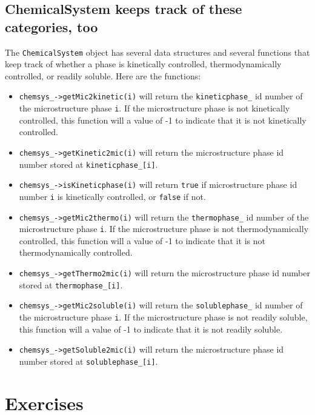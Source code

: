 \documentclass{article}
\begin{document}
\subsection{ChemicalSystem keeps track of these categories, too}
The \verb!ChemicalSystem! object has several data structures and several functions
that keep track of whether a phase is kinetically controlled, thermodynamically
controlled, or readily soluble.  Here are the functions:
\begin{itemize}
    \item  \verb!chemsys_->getMic2kinetic(i)! will return the \verb!kineticphase_! id
        number of the microstructure phase \verb!i!.  If the microstructure phase is
        not kinetically controlled, this function will a value of -1 to indicate
        that it is not kinetically controlled.
    \item  \verb!chemsys_->getKinetic2mic(i)! will return the microstructure phase
        id number stored at \verb!kineticphase_[i]!.
    \item  \verb!chemsys_->isKineticphase(i)! will return \verb!true! if microstructure
        phase id number \verb!i! is kinetically controlled, or \verb!false! if not.
    \item  \verb!chemsys_->getMic2thermo(i)! will return the \verb!thermophase_! id
        number of the microstructure phase \verb!i!.  If the microstructure phase is
        not thermodynamically controlled, this function will a value of -1 to indicate
        that it is not thermodynamically controlled.
    \item  \verb!chemsys_->getThermo2mic(i)! will return the microstructure phase
        id number stored at \verb!thermophase_[i]!.
    \item  \verb!chemsys_->getMic2soluble(i)! will return the \verb!solublephase_! id
        number of the microstructure phase \verb!i!.  If the microstructure phase is
        not readily soluble, this function will a value of -1 to indicate
        that it is not readily soluble.
    \item  \verb!chemsys_->getSoluble2mic(i)! will return the microstructure phase
        id number stored at \verb!solublephase_[i]!.
\end{itemize}


\section{Exercises}
\end{document}
